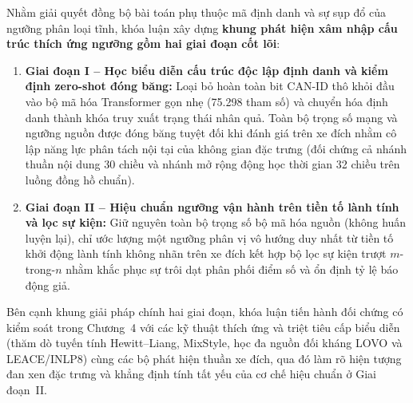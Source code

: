 \documentclass[12pt, a4paper, reqno, oneside]{book}
\begin{document}
Nhằm giải quyết đồng bộ bài toán phụ thuộc mã định danh và sự sụp đổ của ngưỡng phân loại tĩnh, khóa luận xây dựng \textbf{khung phát hiện xâm nhập cấu trúc thích ứng ngưỡng gồm hai giai đoạn cốt lõi}:
\begin{enumerate}
    \item \textbf{Giai đoạn I -- Học biểu diễn cấu trúc độc lập định danh và kiểm định zero-shot đóng băng:} Loại bỏ hoàn toàn bit CAN-ID thô khỏi đầu vào bộ mã hóa Transformer gọn nhẹ (75.298 tham số) và chuyển hóa định danh thành khóa truy xuất trạng thái nhân quả. Toàn bộ trọng số mạng và ngưỡng nguồn được đóng băng tuyệt đối khi đánh giá trên xe đích nhằm cô lập năng lực phân tách nội tại của không gian đặc trưng (đối chứng cả nhánh thuần nội dung 30 chiều và nhánh mở rộng động học thời gian 32 chiều trên luồng đồng hồ chuẩn).
    \item \textbf{Giai đoạn II -- Hiệu chuẩn ngưỡng vận hành trên tiền tố lành tính và lọc sự kiện:} Giữ nguyên toàn bộ trọng số bộ mã hóa nguồn (không huấn luyện lại), chỉ ước lượng một ngưỡng phân vị vô hướng duy nhất từ tiền tố khởi động lành tính không nhãn trên xe đích kết hợp bộ lọc sự kiện trượt $m$-trong-$n$ nhằm khắc phục sự trôi dạt phân phối điểm số và ổn định tỷ lệ báo động giả.
\end{enumerate}

Bên cạnh khung giải pháp chính hai giai đoạn, khóa luận tiến hành đối chứng có kiểm soát trong Chương~4 với các kỹ thuật thích ứng và triệt tiêu cấp biểu diễn (thăm dò tuyến tính Hewitt--Liang, MixStyle, học đa nguồn đối kháng LOVO và LEACE/INLP8) cùng các bộ phát hiện thuần xe đích, qua đó làm rõ hiện tượng đan xen đặc trưng và khẳng định tính tất yếu của cơ chế hiệu chuẩn ở Giai đoạn~II.
\end{document}
